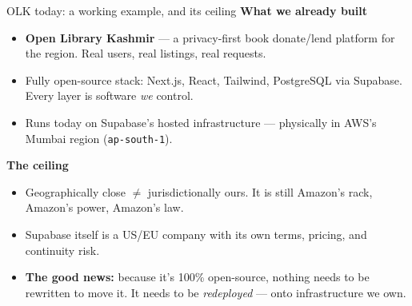 \documentclass[aspectratio=169,10pt]{beamer}
\newcommand{\eyebrow}[1]{{\small\color{sovGold}\textbf{#1}}}
\begin{document}
\begin{frame}{OLK today: a working example, and its ceiling}
  \eyebrow{What we already built}
  \begin{itemize}
    \item \textbf{Open Library Kashmir} --- a privacy-first book donate/lend platform for the region. Real users, real listings, real requests.
    \item Fully open-source stack: Next.js, React, Tailwind, PostgreSQL via Supabase. Every layer is software \emph{we} control.
    \item Runs today on Supabase's hosted infrastructure --- physically in AWS's Mumbai region (\texttt{ap-south-1}).
  \end{itemize}
  \vspace{6pt}
  \eyebrow{The ceiling}
  \begin{itemize}
    \item Geographically close $\ne$ jurisdictionally ours. It is still Amazon's rack, Amazon's power, Amazon's law.
    \item Supabase itself is a US/EU company with its own terms, pricing, and continuity risk.
    \item \textbf{The good news:} because it's 100\% open-source, nothing needs to be rewritten to move it. It needs to be \emph{redeployed} --- onto infrastructure we own.
  \end{itemize}
\end{frame}
\end{document}
